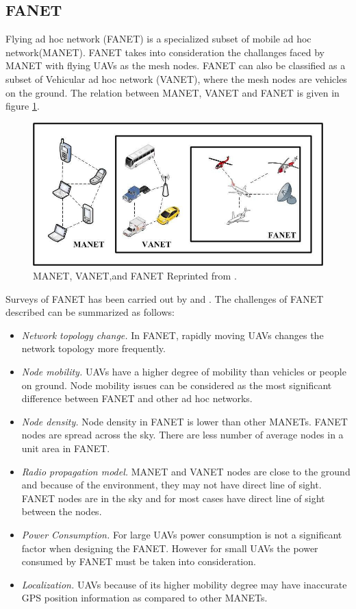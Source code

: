 \subsection{FANET}

Flying ad hoc network (FANET) is a specialized subset of mobile ad hoc network(MANET). FANET takes into consideration the challanges faced by MANET with flying UAVs as the mesh nodes. FANET can also be classified as a subset of Vehicular ad hoc network (VANET), where the mesh nodes are vehicles on the ground. The relation between MANET, VANET and FANET is given in figure \ref{fig:manet-vanet-and-fanet}.

\begin{figure}
	\centering
	\includegraphics[width=5in]{figures/literature/MANET-VANET-and-FANET}
	\caption[MANET, VANET and FANET]{\small 
		MANET, VANET,and FANET Reprinted from . }
	\label{fig:manet-vanet-and-fanet}
\end{figure}

Surveys of FANET has been carried out by  and . The challenges of FANET described can be summarized as follows:

\begin{itemize}
	\item \textit{Network topology change.} In FANET, rapidly moving UAVs changes the network topology more frequently.
	\item \textit{Node mobility.} UAVs have a higher degree of mobility than vehicles or people on ground. Node mobility issues can be considered as the most significant difference between FANET and other ad hoc networks.
	\item \textit{Node density.} Node density in FANET is lower than other MANETs. FANET nodes are spread across the sky. There are less number of average nodes in a unit area in FANET. 
	\item \textit{Radio propagation model.} MANET and VANET nodes are close to the ground and because of the environment, they may not have direct line of sight. FANET nodes are in the sky and for most cases have direct line of sight between the nodes.
	\item \textit{Power Consumption.} For large UAVs power consumption is not a significant factor when designing the FANET. However for small UAVs the power consumed by FANET must be taken into consideration.  
	\item \textit{Localization.} UAVs because of its higher mobility degree may have inaccurate GPS position information as compared to other MANETs.	
\end{itemize}

